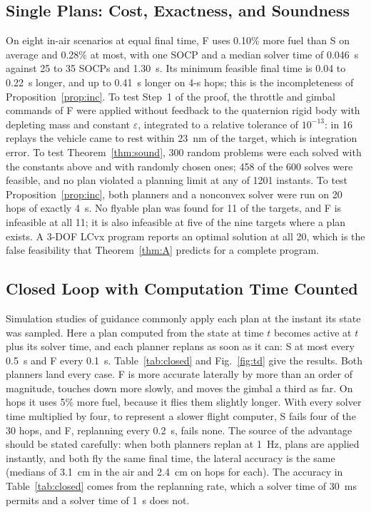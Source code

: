 \subsection{Single Plans: Cost, Exactness, and Soundness}
On eight in-air scenarios at equal final time, F uses 0.10\% more fuel than S on average and 0.28\% at most, with one SOCP
and a median solver time of 0.046~s against 25 to 35 SOCPs and 1.30~s. Its minimum feasible final time is 0.04 to 0.22~s
longer, and up to 0.41~s longer on 4-s hops; this is the incompleteness of Proposition~\ref{prop:inc}. To test Step~1 of the
proof, the throttle and gimbal commands of F were applied without feedback to the quaternion rigid body with depleting mass
and constant $\varepsilon$, integrated to a relative tolerance of $10^{-13}$: in 16 replays the vehicle came to rest within
23~nm of the target, which is integration error. To test Theorem~\ref{thm:sound}, 300 random problems were each solved with
the constants above and with randomly chosen ones; 458 of the 600 solves were feasible, and no plan violated a planning limit
at any of 1201 instants. To test Proposition~\ref{prop:inc}, both planners and a nonconvex solver were run on 20 hops of
exactly 4~s. No flyable plan was found for 11 of the targets, and F is infeasible at all 11; it is also infeasible at five of
the nine targets where a plan exists. A 3-DOF LCvx program reports an optimal solution at all 20, which is the false
feasibility that Theorem~\ref{thm:A} predicts for a complete program.

\subsection{Closed Loop with Computation Time Counted}
Simulation studies of guidance commonly apply each plan at the instant its state was sampled. Here a plan computed from the
state at time $t$ becomes active at $t$ plus its solver time, and each planner replans as soon as it can: S at most every
0.5~s and F every 0.1~s. Table~\ref{tab:closed} and Fig.~\ref{fig:td} give the results. Both planners land every case. F is more accurate
laterally by more than an order of magnitude, touches down more slowly, and moves the gimbal a third as far. On hops it uses
5\% more fuel, because it flies them slightly longer. With every solver time multiplied by four, to represent a slower flight
computer, S fails four of the 30 hops, and F, replanning every 0.2~s, fails none. The source of the advantage should be
stated carefully: when both planners replan at 1~Hz, plans are applied instantly, and both fly the same final time, the
lateral accuracy is the same (medians of 3.1~cm in the air and 2.4~cm on hops for each). The accuracy in
Table~\ref{tab:closed} comes from the replanning rate, which a solver time of 30~ms permits and a solver time of 1~s does not.

